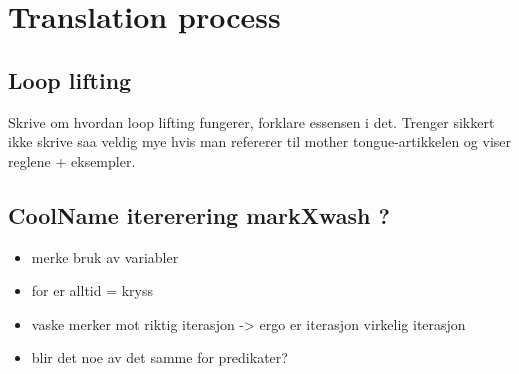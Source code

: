 \section{Translation process}
\subsection{Loop lifting}
\label{sect:method:loop_lifting}
Skrive om hvordan loop lifting fungerer, forklare essensen i det. Trenger
sikkert ikke skrive saa veldig mye hvis man refererer til mother
tongue-artikkelen og viser reglene + eksempler. 

\subsection{CoolName itererering markXwash ?}
\label{sect:method:madslifting}
\begin{itemize}
\item merke bruk av variabler
\item for er alltid = kryss
\item vaske merker mot riktig iterasjon -> ergo er iterasjon virkelig iterasjon
\item blir det noe av det samme for predikater?
\end{itemize}